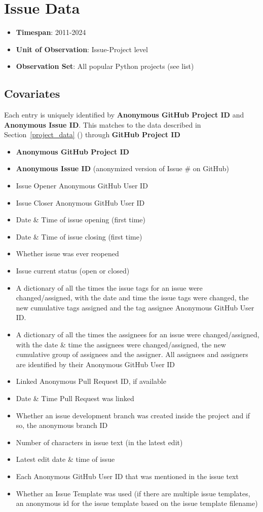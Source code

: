 \documentclass[12pt,notitlepage]{article}
\begin{document}
\section{Issue Data} \label{issue_data}
\begin{itemize}
    \item \textbf{Timespan}: 2011-2024
    \item \textbf{Unit of Observation}: Issue-Project level
    \item \textbf{Observation Set}: All popular Python projects (see list)
\end{itemize}
\subsection*{Covariates}
Each entry is uniquely identified by \textbf{Anonymous GitHub Project ID} and \textbf{Anonymous Issue ID}. This matches to the data described in Section~\ref{project_data} () through \textbf{GitHub Project ID}
\begin{itemize}
    \item \textbf{Anonymous GitHub Project ID}
    \item \textbf{Anonymous Issue ID} (anonymized version of Issue \# on GitHub)
    \item Issue Opener Anonymous GitHub User ID
    \item Issue Closer Anonymous GitHub User ID
    \item Date \& Time of issue opening (first time)
    \item Date \& Time of issue closing (first time)
    \item Whether issue was ever reopened 
    \item Issue current status (open or closed)
    \item A dictionary of all the times the issue tags for an issue were changed/assigned, with the date and time the issue tags were changed, the new cumulative tags assigned and the tag assignee Anonymous GitHub User ID.
    \item A dictionary of all the times the assignees for an issue were changed/assigned, with the date \& time the assignees were changed/assigned, the new cumulative group of assignees and the assigner. All assignees and assigners are identified by their Anonymous GitHub User ID
    \item Linked Anonymous Pull Request ID, if available
    \item Date \& Time Pull Request was linked
    \item Whether an issue development branch was created inside the project and if so, the anonymous branch ID
    \item Number of characters in issue text (in the latest edit)
    \item Latest edit date \& time of issue
    \item Each Anonymous GitHub User ID that was mentioned in the issue text
    \item Whether an Issue Template was used (if there are multiple issue templates, an anonymous id for the issue template based on the issue template filename)
\end{itemize}
\end{document}
